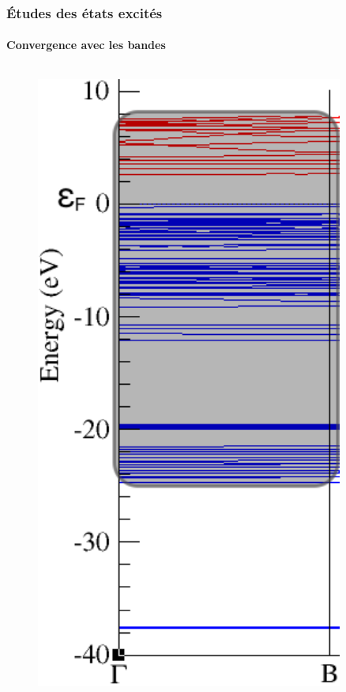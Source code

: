 \documentclass[french]{beamer}
\begin{document}
\begin{frame}
\frametitle{Études des états excités}
\framesubtitle{Convergence avec les bandes}
\begin{columns}
  \begin{column}{\paperwidth-10pt}
    \begin{figure}[!h]
    \centering
    \vspace{10pt}
    \includegraphics[width=0.9\textwidth]{band_structure}

\end{figure}
\end{column}
\end{columns}
\end{frame}
\end{document}

